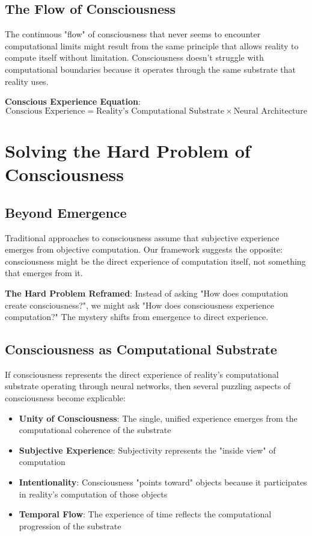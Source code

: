 \documentclass[12pt]{article}
\begin{document}
\subsection{The Flow of Consciousness}

The continuous "flow" of consciousness that never seems to encounter computational limits might result from the same principle that allows reality to compute itself without limitation. Consciousness doesn't struggle with computational boundaries because it operates through the same substrate that reality uses.

\textbf{Conscious Experience Equation}:
$$\text{Conscious Experience} = \text{Reality's Computational Substrate} \times \text{Neural Architecture}$$

\section{Solving the Hard Problem of Consciousness}

\subsection{Beyond Emergence}

Traditional approaches to consciousness assume that subjective experience emerges from objective computation. Our framework suggests the opposite: consciousness might be the direct experience of computation itself, not something that emerges from it.

\textbf{The Hard Problem Reframed}: Instead of asking "How does computation create consciousness?", we might ask "How does consciousness experience computation?" The mystery shifts from emergence to direct experience.

\subsection{Consciousness as Computational Substrate}

If consciousness represents the direct experience of reality's computational substrate operating through neural networks, then several puzzling aspects of consciousness become explicable:

\begin{itemize}
\item \textbf{Unity of Consciousness}: The single, unified experience emerges from the computational coherence of the substrate
\item \textbf{Subjective Experience}: Subjectivity represents the "inside view" of computation
\item \textbf{Intentionality}: Consciousness "points toward" objects because it participates in reality's computation of those objects
\item \textbf{Temporal Flow}: The experience of time reflects the computational progression of the substrate
\end{itemize}
\end{document}

